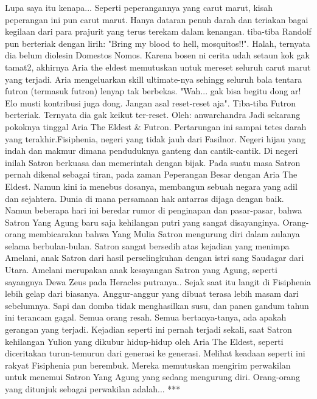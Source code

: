 \documentclass[a4paper,11pt,final]{article}
\begin{document}
Lupa saya itu kenapa...
Seperti peperangannya yang carut marut, kisah peperangan ini pun carut marut. Hanya dataran penuh darah dan teriakan bagai kegilaan dari para prajurit yang terus terekam dalam kenangan.
tiba-tiba Randolf pun berteriak dengan lirih: "Bring my blood to hell, mosquitos!!". Halah, ternyata dia belum diolesin Domestos Nomos.
Karena bosen ni cerita udah setaun kok gak tamat2, akhirnya Aria the eldest memutuskan untuk mereset seluruh carut marut yang terjadi. Aria mengeluarkan skill ultimate-nya sehingg seluruh bala tentara futron (termasuk futron) lenyap tak berbekas.
"Wah... gak bisa begitu dong ar! Elo musti kontribusi juga dong. Jangan asal reset-reset aja". Tiba-tiba Futron berteriak. Ternyata dia gak keikut ter-reset.
Oleh: anwarchandra
Jadi sekarang pokoknya tinggal Aria The Eldest \& Futron. Pertarungan ini sampai tetes darah yang terakhir.Fisiphenia, negeri yang tidak jauh dari Fasilnor. Negeri hijau yang indah dan makmur dimana penduduknya ganteng dan cantik-cantik. Di negeri inilah Satron berkuasa dan memerintah dengan bijak.
Pada suatu masa Satron pernah dikenal sebagai tiran, pada zaman Peperangan Besar dengan Aria The Eldest. Namun kini ia menebus dosanya, membangun sebuah negara yang adil dan sejahtera. Dunia di mana persamaan hak antarras dijaga dengan baik.
Namun beberapa hari ini beredar rumor di penginapan dan pasar-pasar, bahwa Satron Yang Agung baru saja kehilangan putri yang sangat disayanginya. Orang-orang membicarakan bahwa Yang Mulia Satron mengurung diri dalam aulanya selama berbulan-bulan.
Satron sangat bersedih atas kejadian yang menimpa Amelani, anak Satron dari hasil perselingkuhan dengan istri sang Saudagar dari Utara. Amelani merupakan anak kesayangan Satron yang Agung, seperti sayangnya Dewa Zeus pada Heracles putranya..
Sejak saat itu langit di Fisiphenia lebih gelap dari biasanya. Anggur-anggur yang dibuat terasa lebih masam dari sebelumnya. Sapi dan domba tidak menghasilkan susu, dan panen gandum tahun ini terancam gagal. Semua orang resah.
Semua bertanya-tanya, ada apakah gerangan yang terjadi. Kejadian seperti ini pernah terjadi sekali, saat Satron kehilangan Yulion yang dikubur hidup-hidup oleh Aria The Eldest, seperti diceritakan turun-temurun dari generasi ke generasi.
Melihat keadaan seperti ini rakyat Fisiphenia pun berembuk. Mereka memutuskan mengirim perwakilan untuk menemui Satron Yang Agung yang sedang mengurung diri. Orang-orang yang ditunjuk sebagai perwakilan adalah...
***
\end{document}
